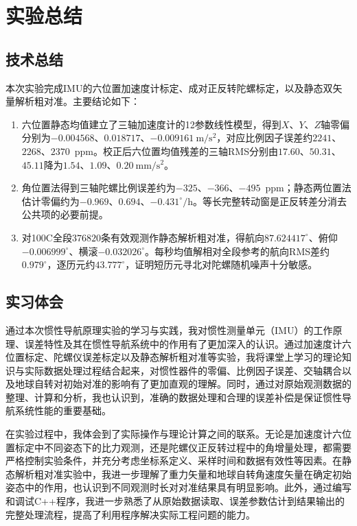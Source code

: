 \section{实验总结}

\subsection{技术总结}
本次实验完成IMU的六位置加速度计标定、成对正反转陀螺标定，以及静态双矢量解析粗对准。主要结论如下：
\begin{enumerate}[leftmargin=2em]
\item 六位置静态均值建立了三轴加速度计的12参数线性模型，得到$X$、$Y$、$Z$轴零偏分别为$-0.004568$、$0.018717$、$-0.009161~\mathrm{m/s^2}$，对应比例因子误差约$2241$、$2268$、$2370$~ppm。校正后六位置均值残差的三轴RMS分别由$17.60$、$50.31$、$45.11$降为$1.54$、$1.09$、$0.20~\mathrm{mm/s^2}$。
\item 角位置法得到三轴陀螺比例误差约为$-325$、$-366$、$-495$~ppm；静态两位置法估计零偏约为$-0.969$、$0.694$、$-0.431^\circ/\mathrm h$。等长完整转动窗是正反转差分消去公共项的必要前提。
\item 对100C全段$376820$条有效观测作静态解析粗对准，得航向$87.624417^\circ$、俯仰$-0.006999^\circ$、横滚$-0.032026^\circ$。每秒均值解相对全段参考的航向RMS差约$0.979^\circ$，逐历元约$43.777^\circ$，证明短历元寻北对陀螺随机噪声十分敏感。
\end{enumerate}

\subsection{实习体会}
通过本次惯性导航原理实验的学习与实践，我对惯性测量单元（IMU）的工作原理、误差特性及其在惯性导航系统中的作用有了更加深入的认识。通过加速度计六位置标定、陀螺仪误差标定以及静态解析粗对准等实验，我将课堂上学习的理论知识与实际数据处理过程结合起来，对惯性器件的零偏、比例因子误差、交轴耦合以及地球自转对初始对准的影响有了更加直观的理解。同时，通过对原始观测数据的整理、计算和分析，我也认识到，准确的数据处理和合理的误差补偿是保证惯性导航系统性能的重要基础。

在实验过程中，我体会到了实际操作与理论计算之间的联系。无论是加速度计六位置标定中不同姿态下的比力观测，还是陀螺仪正反转过程中的角增量处理，都需要严格控制实验条件，并充分考虑坐标系定义、采样时间和数据有效性等因素。在静态解析粗对准实验中，我进一步理解了重力矢量和地球自转角速度矢量在确定初始姿态中的作用，也认识到不同观测时长对对准结果具有明显影响。此外，通过编写和调试C++程序，我进一步熟悉了从原始数据读取、误差参数估计到结果输出的完整处理流程，提高了利用程序解决实际工程问题的能力。

